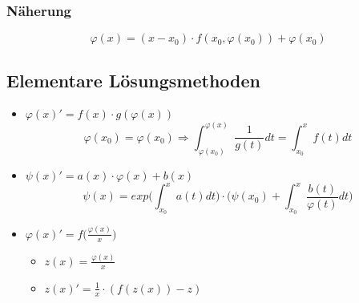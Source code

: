 \subsubsection{Näherung}
\begin{equation*}
    \varphi(x) = (x - x_0) \cdot f(x_0, \varphi(x_0)) + \varphi(x_0)
\end{equation*}

\subsection{Elementare Lösungsmethoden}
\begin{itemize}
    \item $\varphi(x)' = f(x) \cdot g(\varphi(x))$
    \begin{equation*}
        \varphi(x_0) = \varphi(x_0) \Rightarrow
        \int_{\varphi(x_0)}^{\varphi(x)} \frac{1}{g(t)} dt
        = \int_{x_0}^x f(t) dt
    \end{equation*}

    \item $ \psi(x)' = a(x) \cdot \varphi(x) + b(x)$
    \begin{equation*}
        \psi(x) = exp\bigg(\int_{x_0}^x a(t) dt \bigg) \cdot \bigg(\psi(x_0) + \int_{x_0}^x \frac{b(t)}{\varphi(t)} dt \bigg)
    \end{equation*}

    \item $\varphi(x)' = f\big(\frac{\varphi(x)}{x}\big)$
    \begin{itemize}
        \item $z(x) = \frac{\varphi(x)}{x}$
        \item $z(x)' = \frac{1}{x} \cdot (f(z(x)) - z)$
    \end{itemize}
\end{itemize}
